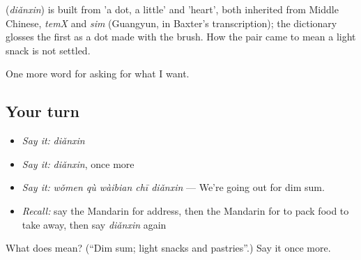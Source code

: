 \begin{cousinweb}
\textbf{} (\emph{diǎnxin}) is built from  'a dot, a little' and  'heart', both inherited from Middle Chinese, \emph{temX} and \emph{sim} (Guangyun, in Baxter's transcription); the dictionary glosses the first as a dot made with the brush. How the pair came to mean a light snack is not settled.
\end{cousinweb}

\begin{grammarlens}[title={What you've built}]
One more word for asking for what I want.
\end{grammarlens}

\subsection*{Your turn}
\begin{itemize}
\raggedright
  \item \emph{Say it:} \emph{diǎnxin}
  \item \emph{Say it:} \emph{diǎnxin}, once more
  \item \emph{Say it:} \emph{wǒmen qù wàibian chī diǎnxin} — We're going out for dim sum.
  \item \emph{Recall:} say the Mandarin for address, then the Mandarin for to pack food to take away, then say \emph{diǎnxin} again
\end{itemize}

\begin{tcolorbox}[breakable,colback=teal!4,colframe=teal!35!black,title={Before you move on}]
What does  mean? (\textquotedblleft{}Dim sum; light snacks and pastries\textquotedblright{}.) Say it once more.
\end{tcolorbox}
